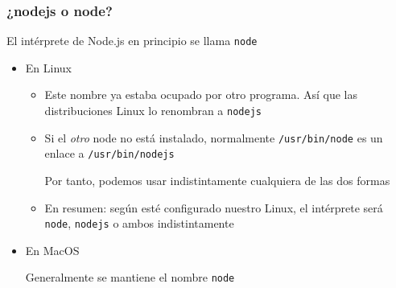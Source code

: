 \documentclass[ucs]{beamer}
\begin{document}
\begin{frame}[fragile]
\frametitle{¿nodejs o node?}

El intérprete de Node.js en principio se llama 
\verb|node|

    \begin{itemize}
\item
En Linux

    \begin{itemize}
    \item

Este nombre ya estaba ocupado por otro programa. Así que las
distribuciones Linux lo renombran a 
\verb|nodejs|

\item
Si el \emph{otro} node no está instalado, normalmente 
\verb|/usr/bin/node| es un enlace a
\verb|/usr/bin/nodejs| 

Por tanto, podemos usar indistintamente cualquiera de las dos formas

\item

En resumen:
según esté configurado nuestro Linux, el intérprete será
\verb|node|,
\verb|nodejs| o 
ambos indistintamente
    \end{itemize}
\item
En MacOS 

Generalmente se mantiene el nombre
\verb|node|
    \end{itemize}

\end{frame}
\end{document}
